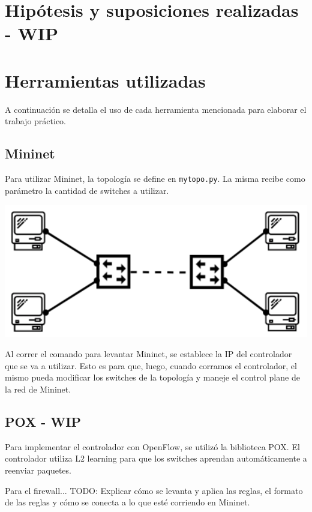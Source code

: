 \documentclass{article}
\begin{document}
\section{Hipótesis y suposiciones realizadas - WIP}\label{hipotesis-y-suposiciones-realizadas-wip}

\newpage
\section{Herramientas utilizadas}\label{implementacion-wip}
A continuación se detalla el uso de cada herramienta mencionada para elaborar el trabajo práctico.

\subsection{Mininet}\label{mininet}

Para utilizar Mininet, la topología se define en \texttt{mytopo.py}. La misma recibe como parámetro la cantidad de switches a utilizar.

\begin{center}
\includegraphics[scale=0.35]{images/mininet_topo.png}
\end{center}

Al correr el comando para levantar Mininet, se establece la IP del controlador que se va a utilizar. Esto es para que, luego, cuando corramos el controlador, el mismo pueda modificar los switches de la topología y maneje el control plane de la red de Mininet.

\subsection{POX - WIP}\label{pox}
Para implementar el controlador con OpenFlow, se utilizó la biblioteca POX. El controlador utiliza L2 learning para que los switches aprendan automáticamente a reenviar paquetes.

Para el firewall...
TODO: Explicar cómo se levanta y aplica las reglas, el formato de las reglas y cómo se conecta a lo que esté corriendo en Mininet.
\end{document}
